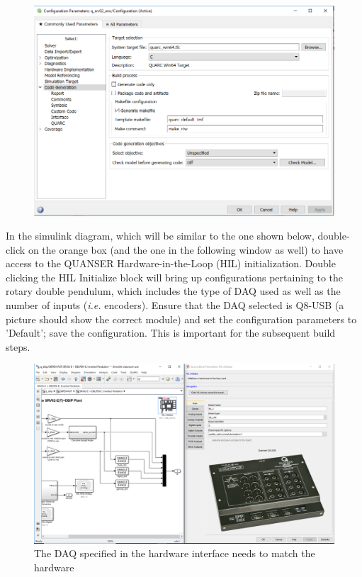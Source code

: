 \documentclass[12pt,letterpaper]{article}
\begin{document}
\begin{figure}[H]
\centering
\includegraphics[width=\linewidth]{img/config.png}
\label{fig:error}
\end{figure}

In the simulink diagram, which will be similar to the one shown below, double-click on the orange box (and the one in the following window as well) to have access to the QUANSER Hardware-in-the-Loop (HIL) initialization. Double clicking the HIL Initialize block will bring up configurations pertaining to the rotary double pendulum, which includes the type of DAQ used as well as the number of inputs (\textit{i.e.} encoders). Ensure that the DAQ selected is Q8-USB (a picture should show the correct module) and set the configuration parameters to 'Default'; save the configuration. This is important for the subsequent build steps.

\begin{figure}[H]
\centering
\includegraphics[width=\linewidth]{img/q8_usb.PNG}
\caption{The DAQ specified in the hardware interface needs to match the hardware}
\label{fig:simulink}
\end{figure}
\end{document}
